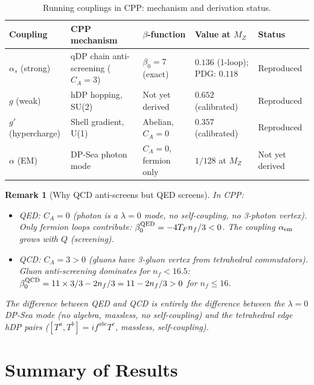 \documentclass[11pt,a4paper]{article}
\newtheorem{remark}[theorem]{Remark}
\newcommand{\as}{\alpha_s}
\begin{document}
\begin{table}[H]
\centering
\caption{Running couplings in CPP: mechanism and derivation status.}
\label{tab:couplings}
\begin{tabular}{@{}p{1.8cm}p{2.5cm}p{3cm}p{3.5cm}l@{}}
\toprule
Coupling & CPP mechanism & $\beta$-function & Value at $M_Z$ & Status \\
\midrule
$\as$ (strong) & qDP chain anti-screening ($C_A = 3$)
  & $\beta_0 = 7$ (exact) & $0.136$ (1-loop); PDG: $0.118$
  & Reproduced \\[4pt]
$g$ (weak) & hDP hopping, SU(2)
  & Not yet derived & $0.652$ (calibrated) & Reproduced \\[4pt]
$g'$ (hypercharge) & Shell gradient, U(1)
  & Abelian, $C_A = 0$ & $0.357$ (calibrated) & Reproduced \\[4pt]
$\alpha$ (EM) & DP-Sea photon mode
  & $C_A = 0$, fermion only & $1/128$ at $M_Z$ & Not yet derived \\
\bottomrule
\end{tabular}
\end{table}

\begin{remark}[Why QCD anti-screens but QED screens]
In CPP:
\begin{itemize}
\item QED: $C_A = 0$ (photon is a $\lambda=0$ mode, no self-coupling,
  no 3-photon vertex). Only fermion loops contribute:
  $\beta_0^{\rm QED} = -4T_F n_f / 3 < 0$.  The coupling
  $\alpha_{\rm em}$ \emph{grows} with $Q$ (screening).
\item QCD: $C_A = 3 > 0$ (gluons have 3-gluon vertex from
  tetrahedral commutators).  Gluon anti-screening dominates
  for $n_f < 16.5$: $\beta_0^{\rm QCD} = 11 \times 3/3 -
  2n_f/3 = 11 - 2n_f/3 > 0$ for $n_f \leq 16$.
\end{itemize}
The difference between QED and QCD is entirely the difference
between the $\lambda = 0$ DP-Sea mode (no algebra, massless,
no self-coupling) and the tetrahedral edge hDP pairs
($[T^a, T^b] = if^{abc}T^c$, massless, self-coupling).
\end{remark}

\section{Summary of Results}
\end{document}
